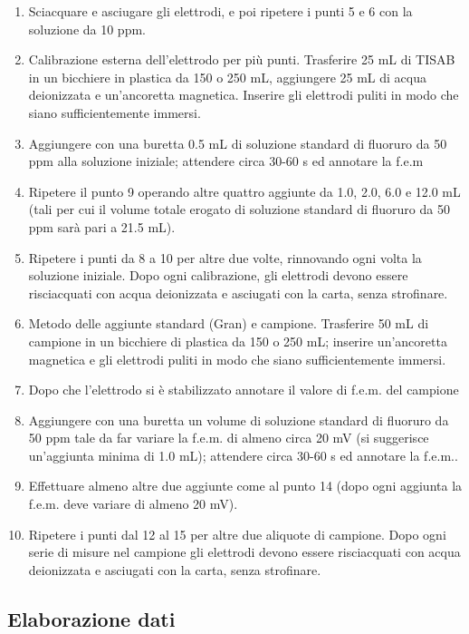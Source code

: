 \begin{enumerate}
\item Sciacquare e asciugare gli elettrodi, e poi ripetere i punti 5 e 6 con la soluzione da 10 ppm.
\item Calibrazione esterna dell'elettrodo per più punti. Trasferire 25 mL di TISAB in un bicchiere in plastica da 150 o 250 mL, aggiungere 25 mL di acqua deionizzata e un'ancoretta magnetica. Inserire gli elettrodi puliti in modo che siano sufficientemente immersi.
\item Aggiungere con una buretta 0.5 mL di soluzione standard di fluoruro da 50 ppm alla soluzione iniziale; attendere circa 30-60 s ed annotare la f.e.m
\item Ripetere il punto 9 operando altre quattro aggiunte da 1.0, 2.0, 6.0 e 12.0 mL (tali per cui il volume totale erogato di soluzione standard di fluoruro da 50 ppm sarà pari a 21.5 mL).
\item Ripetere i punti da 8 a 10 per altre due volte, rinnovando ogni volta la soluzione iniziale. Dopo ogni calibrazione, gli elettrodi devono essere risciacquati con acqua deionizzata e asciugati con la carta, senza strofinare.
\item Metodo delle aggiunte standard (Gran) e campione. Trasferire 50 mL di campione in un bicchiere di plastica da 150 o 250 mL; inserire un'ancoretta magnetica e gli elettrodi puliti in modo che siano sufficientemente immersi.
\item Dopo che l'elettrodo si è stabilizzato annotare il valore di f.e.m. del campione
\item Aggiungere con una buretta un volume di soluzione standard di fluoruro da 50 ppm tale da far variare la f.e.m. di almeno circa 20 mV (si suggerisce un'aggiunta minima di 1.0 mL); attendere circa 30-60 s ed annotare la f.e.m..
\item Effettuare almeno altre due aggiunte come al punto 14 (dopo ogni aggiunta la f.e.m. deve variare di almeno 20 mV).
\item Ripetere i punti dal 12 al 15 per altre due aliquote di campione. Dopo ogni serie di misure nel campione gli elettrodi devono essere risciacquati con acqua deionizzata e asciugati con la carta, senza strofinare.
\end{enumerate}

\subsection{Elaborazione dati}

